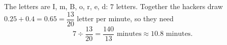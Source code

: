 The letters are I, m, B, o, r, e, d: $7$ letters. Together the hackers draw $0.25+0.4=0.65=\dfrac{13}{20}$ letter per minute, so they need
\[7\div\dfrac{13}{20}=\boxed{\dfrac{140}{13}\text{ minutes}}\approx10.8\text{ minutes}.\]
